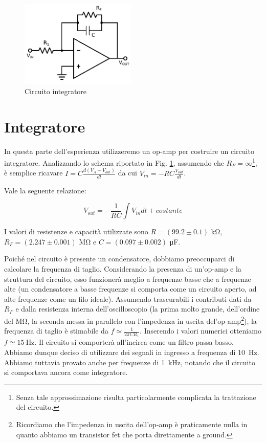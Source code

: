 \begin{figure}
	\includegraphics[width=55mm]{ccint.pdf}
	\caption{Circuito integratore}
	\label{fig:ccint}
\end{figure}

\section{Integratore}

In questa parte dell'esperienza utilizzeremo un op-amp per costruire un circuito integratore. Analizzando lo schema riportato in Fig. \ref{fig:ccint}, assumendo che $R_F=\infty$\footnote{Senza tale approssimazione risulta particolarmente complicata la trattazione del circuito.}, è semplice ricavare $I=C\frac{d(V_A-V_{out})}{dt}$ da cui $V_{in}=-RC\frac{V_{out}}{dt}$.

Vale la seguente relazione:%

\begin{equation}
V_{out}=-\frac{1}{RC} \int V_{in}dt +costante
\label{eq:int}
\end{equation}

I valori di resistenze e capacità utilizzate sono $R=(99.2 \pm 0.1)$ \si{\kilo\ohm},\\
$R_F=(2.247 \pm 0.001)$ \si{\mega\ohm} e $C=(0.097 \pm 0.002)$ \si{\micro\farad}. 

Poiché nel circuito è presente un condensatore, dobbiamo preoccuparci di calcolare la frequenza di taglio.
Considerando la presenza di un'op-amp e la struttura del circuito, esso funzionerà meglio a frequenze basse che a frequenze alte (un condensatore a basse frequenze si comporta come un circuito aperto, ad alte frequenze come un filo ideale).
Assumendo trascurabili i contributi dati da $R_F$ e dalla resistenza interna dell'oscilloscopio (la prima molto grande, dell'ordine del $\si{\mega\ohm}$, la seconda messa in parallelo con l'impedenza in uscita del'op-amp\footnote{Ricordiamo che l'impedenza in uscita dell'op-amp è praticamente nulla in quanto abbiamo un transistor fet che porta direttamente a ground.}), la frequenza di taglio è stimabile da $f\simeq \frac{1}{2\pi C R_1}$.
Inserendo i valori numerici otteniamo $f \simeq \SI{15}{\hertz}$.
Il circuito si comporterà all'incirca come un filtro passa basso.
Abbiamo dunque deciso di utilizzare dei segnali in ingresso a frequenza di \SI{10}{\hertz}.
Abbiamo tuttavia provato anche per frequenze di \SI{1}{\kilo\hertz}, notando che il circuito si comportava ancora come integratore.

